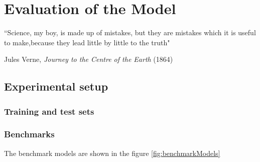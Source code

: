 
\chapter{Evaluation of the Model} %

\label{Chapter5} %


``Science, my boy, is made up of mistakes, but they are mistakes which it is useful to make,because
they lead little by little to the truth"

\begin{flushright}
Jules Verne, \textit{Journey to the Centre of the Earth} (1864)
\end{flushright}


\section{Experimental setup}

\subsection{Training and test sets}

\subsection{Benchmarks}
The benchmark models are shown in the figure \ref{fig:benchmarkModels}

